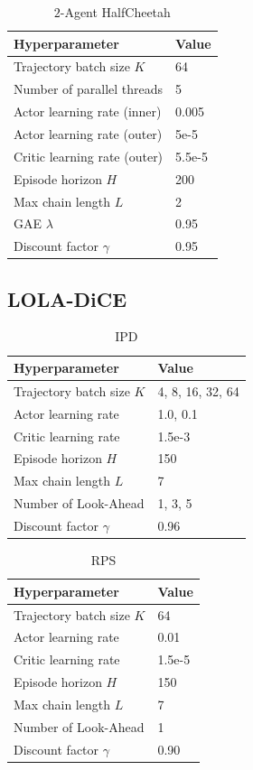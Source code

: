 \begin{table}[H]
\centering
\begin{tabular}{l|l}
Hyperparameter & Value \\ \hline
Trajectory batch size $K$ & 64 \\
Number of parallel threads & 5 \\
Actor learning rate (inner) & 0.005 \\
Actor learning rate (outer) & 5e-5 \\
Critic learning rate (outer) & 5.5e-5 \\
Episode horizon $H$ & 200 \\
Max chain length $L$ & 2 \\
GAE $\lambda$ & 0.95 \\
Discount factor $\gamma$ & 0.95 \\
\end{tabular}
\caption{$2$-Agent HalfCheetah}
\end{table}

\subsection{LOLA-DiCE}
\begin{table}[H]
\centering
\begin{tabular}{l|l}
Hyperparameter & Value \\ \hline
Trajectory batch size $K$ & 4, 8, 16, 32, 64 \\
Actor learning rate & 1.0, 0.1 \\
Critic learning rate & 1.5e-3 \\
Episode horizon $H$ & 150 \\
Max chain length $L$ & 7 \\
Number of Look-Ahead & 1, 3, 5 \\
Discount factor $\gamma$ & 0.96 \\
\end{tabular}
\caption{IPD}
\end{table}

\begin{table}[H]
\centering
\begin{tabular}{l|l}
Hyperparameter & Value \\ \hline
Trajectory batch size $K$ & 64 \\
Actor learning rate & 0.01 \\
Critic learning rate & 1.5e-5 \\
Episode horizon $H$ & 150 \\
Max chain length $L$ & 7 \\
Number of Look-Ahead & 1 \\
Discount factor $\gamma$ & 0.90 \\
\end{tabular}
\caption{RPS}
\end{table}

